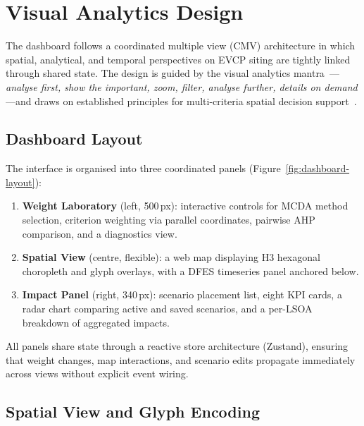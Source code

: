 
\section{Visual Analytics Design}
\label{sec:vis-design}

The dashboard follows a coordinated multiple view (CMV) architecture in which spatial, analytical, and temporal perspectives on EVCP siting are tightly linked through shared state. The design is guided by the visual analytics mantra~\cite{keim2008visual}---\emph{analyse first, show the important, zoom, filter, analyse further, details on demand}---and draws on established principles for multi-criteria spatial decision support~\cite{andrienko2007geovisual,jankowski2001gis}.

\subsection{Dashboard Layout}
\label{sec:layout}

The interface is organised into three coordinated panels (Figure~\ref{fig:dashboard-layout}):

\begin{enumerate}[nosep]
    \item \textbf{Weight Laboratory} (left, 500\,px): interactive controls for MCDA method selection, criterion weighting via parallel coordinates, pairwise AHP comparison, and a diagnostics view.
    \item \textbf{Spatial View} (centre, flexible): a web map displaying H3 hexagonal choropleth and glyph overlays, with a DFES timeseries panel anchored below.
    \item \textbf{Impact Panel} (right, 340\,px): scenario placement list, eight KPI cards, a radar chart comparing active and saved scenarios, and a per-LSOA breakdown of aggregated impacts.
\end{enumerate}

\noindent All panels share state through a reactive store architecture (Zustand), ensuring that weight changes, map interactions, and scenario edits propagate immediately across views without explicit event wiring.

\subsection{Spatial View and Glyph Encoding}
\label{sec:spatial-view}

